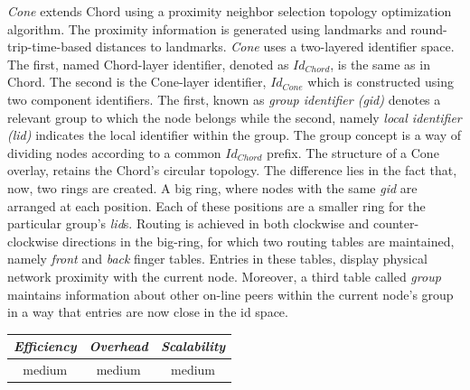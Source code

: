 \emph{Cone} \cite{HY2007} extends Chord using a proximity neighbor
selection topology optimization algorithm. The proximity information is
generated using landmarks and round-trip-time-based distances to landmarks.
\emph{Cone} uses a two-layered identifier space. The first, named Chord-layer
identifier, denoted as $Id_{Chord}$, is the same as in Chord. The second is the
Cone-layer identifier, $Id_{Cone}$ which is constructed using two component
identifiers. The first, known as \emph{group identifier (gid)} denotes a
relevant group to which the node belongs while the second, namely \emph{local
identifier (lid)} indicates the local identifier within the group. The group
concept is a way of dividing nodes according to a
common $Id_{Chord}$ prefix.  The structure of a Cone overlay, retains the
Chord's circular topology. The difference lies in the fact that, now, two rings
are created. A big ring, where nodes with the same \emph{gid} are arranged at
each position. Each of these positions are a smaller ring for the particular
group's \emph{lid}s. Routing is achieved in both clockwise and
counter-clockwise directions in the big-ring, for which two routing tables are
maintained, namely \emph{front} and \emph{back} finger tables. Entries in these
tables, display physical network proximity with the current node. Moreover, a
third table called \emph{group} maintains information about other on-line peers
within the current node's group in a way that entries are now close in the id
space.

%
%

\begin{center}
\begin{tabular}{ccc}
\emph{Efficiency} & \emph{Overhead} & \emph{Scalability} \\
\hline
medium &
medium &
medium
\end{tabular}
\end{center}


